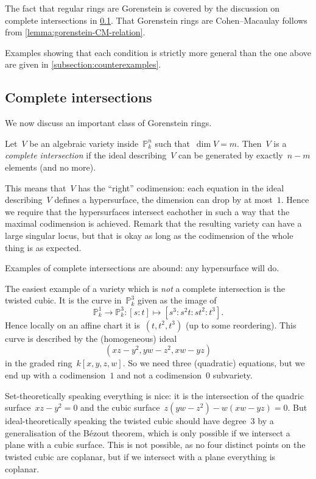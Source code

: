 \documentclass[10pt,a4paper]{article}
\begin{document}
The fact that regular rings are Gorenstein is covered by the discussion on complete intersections in \cref{subsection:complete-intersections}. That Gorenstein rings are Cohen--Macaulay follows from \cref{lemma:gorenstein-CM-relation}.

Examples showing that each condition is strictly more general than the one above are given in \cref{subsection:counterexamples}.

\subsection{Complete intersections}
\label{subsection:complete-intersections}
We now discuss an important class of Gorenstein rings.
\begin{definition}
  Let~$V$ be an algebraic variety inside~$\mathbb{P}_k^n$ such that~$\dim V=m$. Then~$V$ is a \emph{complete intersection} if the ideal describing~$V$ can be generated by exactly~$n-m$ elements (and no more).
\end{definition}
This means that~$V$ has the ``right'' codimension: each equation in the ideal describing~$V$ defines a hypersurface, the dimension can drop by at most~$1$. Hence we require that the hypersurfaces intersect eachother in such a way that the maximal codimension is achieved. Remark that the resulting variety can have a large singular locus, but that is okay as long as the codimension of the whole thing is as expected.
\begin{example}
  Examples of complete intersections are abound: any hypersurface will do.
\end{example}
\begin{example}
  The easiest example of a variety which is \emph{not} a complete intersection is the twisted cubic. It is the curve in~$\mathbb{P}_k^3$ given as the image of
  \begin{equation}
    \mathbb{P}_k^1\to\mathbb{P}_k^3:[s:t]\mapsto[s^3:s^2t:st^2:t^3].
  \end{equation}
  Hence locally on an affine chart it is~$(t,t^2,t^3)$ (up to some reordering). This curve is described by the (homogeneous) ideal
  \begin{equation}
    (xz-y^2,yw-z^2,xw-yz)
  \end{equation}
  in the graded ring~$k[x,y,z,w]$. So we need three (quadratic) equations, but we end up with a codimension~$1$ and not a codimension~$0$ subvariety.

  Set-theoretically speaking everything is nice: it is the intersection of the quadric surface~$xz-y^2=0$ and the cubic surface~$z(yw-z^2)-w(xw-yz)=0$. But ideal-theoretically speaking the twisted cubic should have degree~$3$ by a generalisation of the B\'ezout theorem, which is only possible if we intersect a plane with a cubic surface. This is not possible, as no four distinct points on the twisted cubic are coplanar, but if we intersect with a plane everything is coplanar.
\end{example}
\end{document}
